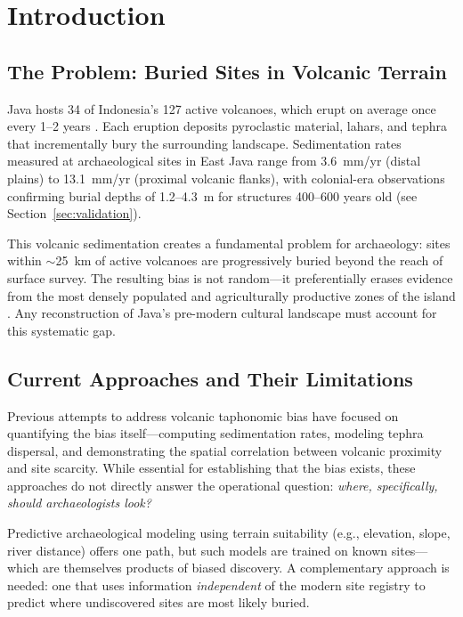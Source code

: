 \documentclass[12pt,a4paper]{article}
\begin{document}
\section{Introduction}

\subsection{The Problem: Buried Sites in Volcanic Terrain}

Java hosts 34 of Indonesia's 127 active volcanoes, which erupt on average once every 1--2 years \citep{gvp2023}. Each eruption deposits pyroclastic material, lahars, and tephra that incrementally bury the surrounding landscape. Sedimentation rates measured at archaeological sites in East Java range from 3.6~mm/yr (distal plains) to 13.1~mm/yr (proximal volcanic flanks), with colonial-era observations confirming burial depths of 1.2--4.3~m for structures 400--600 years old (see Section~\ref{sec:validation}).

This volcanic sedimentation creates a fundamental problem for archaeology: sites within $\sim$25~km of active volcanoes are progressively buried beyond the reach of surface survey. The resulting bias is not random---it preferentially erases evidence from the most densely populated and agriculturally productive zones of the island \citep{mohr1938}. Any reconstruction of Java's pre-modern cultural landscape must account for this systematic gap.

\subsection{Current Approaches and Their Limitations}

Previous attempts to address volcanic taphonomic bias have focused on quantifying the bias itself---computing sedimentation rates, modeling tephra dispersal, and demonstrating the spatial correlation between volcanic proximity and site scarcity. While essential for establishing that the bias exists, these approaches do not directly answer the operational question: \emph{where, specifically, should archaeologists look?}

Predictive archaeological modeling using terrain suitability (e.g., elevation, slope, river distance) offers one path, but such models are trained on known sites---which are themselves products of biased discovery. A complementary approach is needed: one that uses information \emph{independent} of the modern site registry to predict where undiscovered sites are most likely buried.
\end{document}
